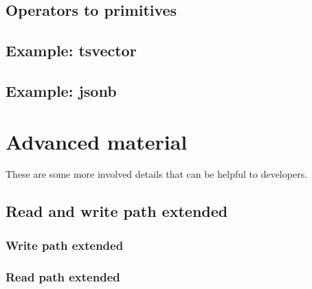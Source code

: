\documentclass[11pt]{article}
\begin{document}
\hypertarget{operators-to-primitives}{%
\subsection{Operators to primitives}\label{operators-to-primitives}}


\hypertarget{example-tsvector}{%
\subsection{Example: tsvector}\label{example-tsvector}}


\hypertarget{example-jsonb}{%
\subsection{Example: jsonb}\label{example-jsonb}}


\hypertarget{advanced-material}{%
\section{Advanced material}\label{advanced-material}}

These are some more involved details that can be helpful to developers.

\hypertarget{read-and-write-path-extended}{%
\subsection{Read and write path
extended}\label{read-and-write-path-extended}}

\hypertarget{write-path-extended}{%
\subsubsection{Write path extended}\label{write-path-extended}}


\hypertarget{read-path-extended}{%
\subsubsection{Read path extended}\label{read-path-extended}}
\end{document}
